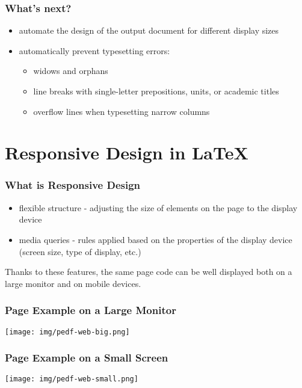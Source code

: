 \begin{frame}
  \frametitle{What's next?}
  \begin{itemize}
  \item automate the design of the output document for different display sizes
  \item automatically prevent typesetting errors:
    \begin{itemize}
      \item widows and orphans
      \item line breaks with single-letter prepositions, units, or academic titles
      \item overflow lines when typesetting narrow columns
    \end{itemize}
  \end{itemize}
\end{frame}


\section{Responsive Design in \LaTeX}

\begin{frame}
   \frametitle{What is Responsive Design}
   \begin{itemize}
     \item flexible structure - adjusting the size of elements on the page to the display device
     \item media queries - rules applied based on the properties of the display device (screen size, type of display, etc.)
   \end{itemize}

   Thanks to these features, the same page code can be well displayed both on a large monitor and on mobile devices.
\end{frame}

\begin{frame}
  \frametitle{Page Example on a Large Monitor}
  \begin{center}
    \texttt{[image: img/pedf-web-big.png]}
  \end{center}
\end{frame}

\begin{frame}
  \frametitle{Page Example on a Small Screen}
  \begin{center}
    \texttt{[image: img/pedf-web-small.png]}
  \end{center}
\end{frame}

